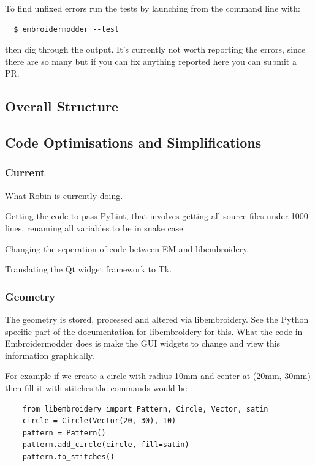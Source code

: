 \documentclass[a4paper, 11pt]{report}
\begin{document}
To find unfixed errors run the tests by launching from the command line with:

\begin{verbatim}
  $ embroidermodder --test
\end{verbatim}

then dig through the output. It's currently not worth reporting the errors, since
there are so many but if you can fix anything reported here you can submit a PR.

\subsection{Overall Structure}

\subsection{Code Optimisations and Simplifications}

\subsubsection{Current}

What Robin is currently doing.

Getting the code to pass PyLint, that involves getting all source files
under 1000 lines, renaming all variables to be in snake case.

Changing the seperation of code between EM and libembroidery.

Translating the Qt widget framework to Tk.

\subsubsection{Geometry}

The geometry is stored, processed and altered via libembroidery. See the Python specific part of the documentation for libembroidery for this. What the code in Embroidermodder does is make the GUI widgets to change and view this information graphically.

For example if we create a circle with radius 10mm and center at (20mm, 30mm) then fill it with stitches the commands would be

\begin{verbatim}
    from libembroidery import Pattern, Circle, Vector, satin
    circle = Circle(Vector(20, 30), 10)
    pattern = Pattern()
    pattern.add_circle(circle, fill=satin)
    pattern.to_stitches()
\end{verbatim}
\end{document}
